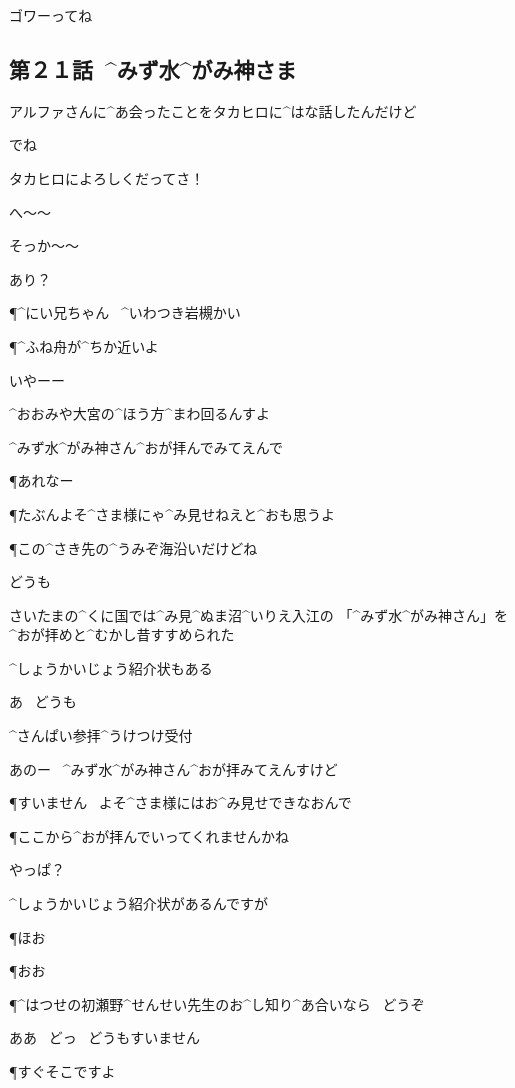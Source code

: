 \A ゴワーってね


\subsection{第２１話\ ^{みず}{水}^{がみ}{神}さま}

\page[84]
\N アルファさんに^{あ}{会}ったことをタカヒロに^{はな}{話}したんだけど

\page
\A でね

\A タカヒロによろしくだってさ！

\T へ〜〜

\T そっか〜〜

\A あり？

\page
\P ^{にい}{兄}ちゃん
\ ^{いわつき}{岩槻}かい

\P ^{ふね}{舟}が^{ちか}{近}いよ

\Y いやーー

\Y ^{おおみや}{大宮}の^{ほう}{方}^{まわ}{回}るんすよ

\Y ^{みず}{水}^{がみ}{神}さん^{おが}{拝}んでみてえんで

\page
\P あれなー

\P たぶんよそ^{さま}{様}にゃ^{み}{見}せねえと^{おも}{思}うよ

\P この^{さき}{先}の^{うみぞ}{海沿}いだけどね

\Y どうも

\Y さいたまの^{くに}{国}では^{み}{見}^{ぬま}{沼}^{いりえ}{入江}の
 「^{みず}{水}^{がみ}{神}さん」を^{おが}{拝}めと^{むかし}{昔}すすめられた

\Y ^{しょうかいじょう}{紹介状}もある

\page
\Y あ
\ どうも

\Sign ^{さんぱい}{参拝}^{うけつけ}{受付}

\Y あのー
\ ^{みず}{水}^{がみ}{神}さん^{おが}{拝}みてえんすけど

\page
\P すいません
\ よそ^{さま}{様}にはお^{み}{見}せできなおんで

\P ここから^{おが}{拝}んでいってくれませんかね

\Y やっぱ？

\Y ^{しょうかいじょう}{紹介状}があるんですが

\P ほお

\P おお

\P ^{はつせの}{初瀬野}^{せんせい}{先生}のお^{し}{知}り^{あ}{合}いなら
\ どうぞ

\Y ああ
\ どっ
\ どうもすいません

\page
\P すぐそこですよ

